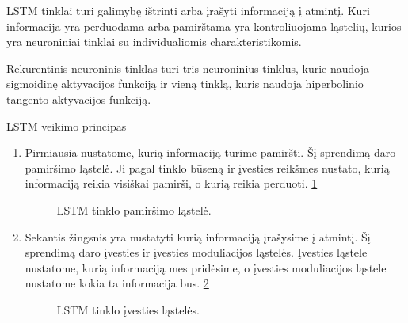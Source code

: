 LSTM tinklai turi galimybę ištrinti arba įrašyti informaciją į atmintį. Kuri informacija yra perduodama arba pamirštama yra kontroliuojama ląstelių, kurios yra neuroniniai tinklai su individualiomis charakteristikomis.\cite{Christopher2015}

Rekurentinis neuroninis tinklas turi tris neuroninius tinklus, kurie naudoja sigmoidinę aktyvacijos funkciją ir vieną tinklą, kuris naudoja hiperbolinio tangento aktyvacijos funkciją.

LSTM veikimo principas \cite{Christopher2015}
\begin{enumerate}
  \item Pirmiausia nustatome, kurią informaciją turime pamiršti. Šį sprendimą daro pamiršimo ląstelė. Ji pagal tinklo būseną ir įvesties reikšmes nustato, kurią informaciją reikia visiškai pamirši, o kurią reikia perduoti. \ref{fig:lstmforget}
  \begin{figure}[h!]
    \centering
  \caption{LSTM tinklo pamiršimo ląstelė.}
  \label{fig:lstmforget}
  \end{figure}
  \item Sekantis žingsnis yra nustatyti kurią informaciją įrašysime į atmintį. Šį sprendimą daro įvesties ir įvesties moduliacijos ląstelės. Įvesties ląstele nustatome, kurią informaciją mes pridėsime, o įvesties moduliacijos ląstele nustatome kokia ta informacija bus. \ref{fig:lstminput}
\begin{figure}[h!]
  \centering
{}
\caption{LSTM tinklo įvesties ląstelės.}
\label{fig:lstminput}
\end{figure}

\end{enumerate}

